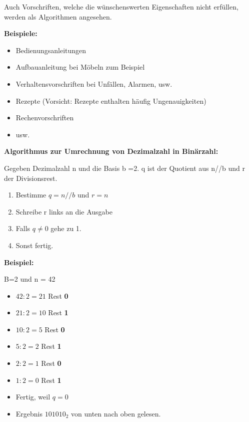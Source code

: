 \documentclass[
  11pt,
  a4paper,
  DIV=11,
  numbers=noendperiod]{scrartcl}
\providecommand{\tightlist}{%
  \setlength{\itemsep}{0pt}\setlength{\parskip}{0pt}}\usepackage{longtable,booktabs,array}
\begin{document}
\begin{tcolorbox}[enhanced jigsaw, bottomrule=.15mm, arc=.35mm, colframe=quarto-callout-tip-color-frame, left=2mm, opacitybacktitle=0.6, colback=white, breakable, title=\textcolor{quarto-callout-tip-color}{\faLightbulb}\hspace{0.5em}{Bemerkung}, titlerule=0mm, toprule=.15mm, rightrule=.15mm, leftrule=.75mm, colbacktitle=quarto-callout-tip-color!10!white, coltitle=black, opacityback=0, toptitle=1mm, bottomtitle=1mm]

Auch Vorschriften, welche die wünschenswerten Eigenschaften nicht
erfüllen, werden als Algorithmen angesehen.

\end{tcolorbox}

\textbf{Beispiele:}

\begin{itemize}
\tightlist
\item
  Bedienungsanleitungen
\item
  Aufbauanleitung bei Möbeln zum Beispiel
\item
  Verhaltensvorschriften bei Unfällen, Alarmen, usw.
\item
  Rezepte (Vorsicht: Rezepte enthalten häufig Ungenauigkeiten)
\item
  Rechenvorschriften
\item
  usw.
\end{itemize}

\textbf{Algorithmus zur Umrechnung von Dezimalzahl in Binärzahl:}

Gegeben Dezimalzahl n und die Basis b =2. q ist der Quotient aus n//b
und r der Divisionsrest.

\begin{enumerate}
\def\labelenumi{\arabic{enumi}.}
\tightlist
\item
  Bestimme \(q = n//b\) und \(r = n%
  \)
\item
  Schreibe r links an die Ausgabe
\item
  Falls \(q \neq 0\) gehe zu 1.
\item
  Sonst fertig.
\end{enumerate}

\textbf{Beispiel:}

B=2 und n = 42

\begin{itemize}
\tightlist
\item
  \(42:2=21\) Rest \textbf{0}
\item
  \(21:2=10\) Rest \textbf{1}
\item
  \(10:2=5\) Rest \textbf{0}
\item
  \(5:2=2\) Rest \textbf{1}
\item
  \(2:2=1\) Rest \textbf{0}
\item
  \(1:2=0\) Rest \textbf{1}
\item
  Fertig, weil \(q=0\)
\item
  Ergebnis \(101010_2\) von unten nach oben gelesen.
\end{itemize}
\end{document}

